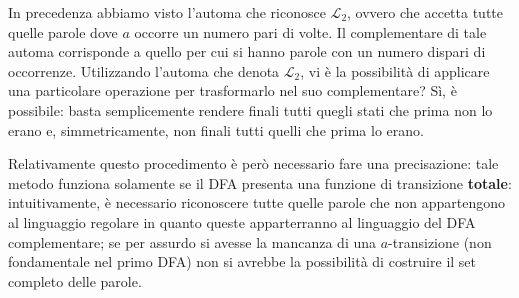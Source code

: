 \documentclass[class=book, crop=false, oneside, 12pt]{standalone}
\begin{document}
In precedenza abbiamo visto l'automa che riconosce \(\mathcal{L}_2\), ovvero che accetta tutte quelle parole dove \(a\) occorre un numero pari di volte. Il complementare di tale automa corrisponde a quello per cui si hanno parole con un numero dispari di occorrenze. Utilizzando l'automa che denota \(\mathcal{L}_2\), vi è la possibilità di applicare una particolare operazione per trasformarlo nel suo complementare? Sì, è possibile: basta semplicemente rendere finali tutti quegli stati che prima non lo erano e, simmetricamente, non finali tutti quelli che prima lo erano.

Relativamente questo procedimento è però necessario fare una precisazione: tale metodo funziona solamente se il DFA presenta una funzione di transizione \textbf{totale}: intuitivamente, è necessario riconoscere tutte quelle parole che non appartengono al linguaggio regolare in quanto queste apparterranno al linguaggio del DFA complementare; se per assurdo si avesse la mancanza di una \(a\)-transizione (non fondamentale nel primo DFA) non si avrebbe la possibilità di costruire il set completo delle parole.
\end{document}

